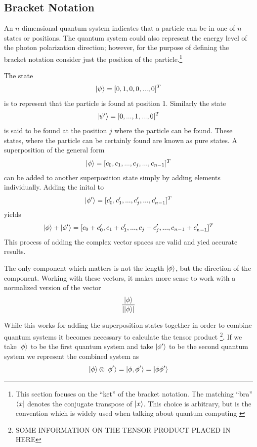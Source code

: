 \documentclass[12pt]{article}
\begin{document}
\subsection{Bracket Notation}
An $n$ dimensional quantum system indicates that a particle can be in one of $n$ states or positions. The quantum system could also represent the energy level of the photon polarization direction; however, for the purpose of defining the bracket notation consider just the position of the particle.\footnote{This section focuses on the ``ket'' of the bracket notation. The matching ``bra'' $\bra{x}$ denotes the conjugate transpose of $\ket{x}$. This choice is arbitrary, but is the convention which is widely used when talking about quantum computing \cite{non}}\par
The state $$\ket{\psi} = [0,1,0,0,...,0]^T$$ is to represent that the particle is found at position 1. Similarly the state $$\ket{\psi'} = [0,...,1,...,0]^T$$ is said to be found at the position $j$ where the particle can be found. These states, where the particle can be certainly found are known as pure states. A superposition of the general form $$\ket{\phi} = [c_0, c_1,...,c_{j},...,c_{n-1}]^T$$ can be added to another superposition state simply by adding elements individually. Adding the inital to $$\ket{\phi'} = [c_0', c_1',...,c_{j}',...,c'_{n-1}]^T$$ yields
$$\ket{\phi} + \ket{\phi'} = [c_0+c_0', c_1+c_1', ..., c_{j}+c'_{j},..., c_{n-1} + c'_{n-1}]^T$$ This process of adding the complex vector spaces are valid and yied accurate results.\par
The only component which matters is not the length $\ket{\phi}$, but the direction of the component. Working with these vectors, it makes more sense to work with a normalized version of the vector $$\frac{\ket{\phi}}{\left|\ket{\phi}\right|}$$\par

While this works for adding the superposition states together in order to combine quantum systems it becomes necessary to calculate the tensor product \footnote{SOME INFORMATION ON THE TENSOR PRODUCT PLACED IN HERE}. If we take $\ket{\phi}$ to be the first quantum system and take $\ket{\phi'}$ to be the second quantum system we represent the combined system as $$\ket{\phi}\otimes\ket{\phi'} = \ket{\phi, \phi'} = \ket{\phi \phi'}$$
\end{document}
